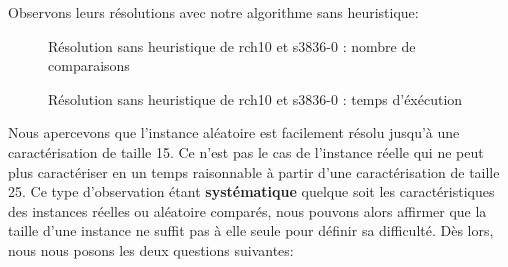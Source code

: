 \documentclass[a4paper,10pt]{article}
\begin{document}
Observons leurs résolutions avec notre algorithme sans heuristique:

\begin{figure}[H]
\begin{center}
\end{center}
\caption{Résolution sans heuristique de rch10 et s3836-0 : nombre de comparaisons}
\end{figure}

\begin{figure}[H]
\begin{center}
\end{center}
\caption{Résolution sans heuristique de rch10 et s3836-0 : temps d'éxécution}
\end{figure}

Nous apercevons que l'instance aléatoire est facilement résolu jusqu'à une caractérisation de taille 15. Ce n'est pas le cas de l'instance réelle qui ne peut plus caractériser en un temps raisonnable à partir d'une caractérisation de taille 25. Ce type d'observation étant \textbf{systématique} quelque soit les caractéristiques des instances réelles ou aléatoire comparés, nous pouvons alors affirmer que la taille d'une instance ne suffit pas à elle seule pour définir sa difficulté. Dès lors, nous nous posons les deux questions suivantes:\\
\end{document}
